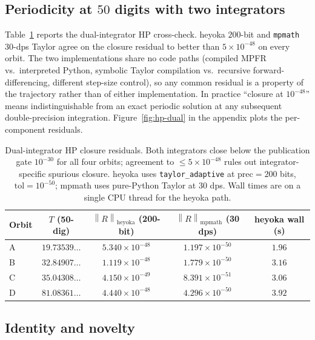 \documentclass[10pt]{article}
\newcommand{\Norm}[1]{\left\lVert#1\right\rVert}
\begin{document}
\subsection{Periodicity at $50$ digits with two integrators}

Table~\ref{tab:hp-dual} reports the dual-integrator HP cross-check.
heyoka $200$-bit and \texttt{mpmath} $30$-dps Taylor agree on the
closure residual to better than $5 \times 10^{-48}$ on every orbit.
The two implementations share no code paths (compiled MPFR vs.\
interpreted Python, symbolic Taylor compilation vs.\ recursive
forward-differencing, different step-size control), so any common
residual is a property of the trajectory rather than of either
implementation. In practice ``closure at $10^{-48}$'' means
indistinguishable from an exact periodic solution at any subsequent
double-precision integration. Figure~\ref{fig:hp-dual} in the
appendix plots the per-component residuals.

\begin{table}[!htb]
\centering
\caption{Dual-integrator HP closure residuals. Both integrators close
below the publication gate $10^{-30}$ for all four orbits; agreement
to $\le\!5\!\times\!10^{-48}$ rules out integrator-specific spurious
closure. heyoka uses \texttt{taylor\_adaptive} at $\mathrm{prec}=200$
bits, $\mathrm{tol} = 10^{-50}$; mpmath uses pure-Python Taylor at
$30$ dps. Wall times are on a single CPU thread for the heyoka path.}
\label{tab:hp-dual}
\footnotesize
\setlength{\tabcolsep}{6pt}
\begin{tabular}{@{}l c c c c@{}}
\toprule
Orbit & $T$ (50-dig) & $\Norm{R}_{\mathrm{heyoka}}$ (200-bit) &
$\Norm{R}_{\mathrm{mpmath}}$ (30 dps) & heyoka wall (s)\\
\midrule
A & $19.73539\ldots$ & $5.340\times 10^{-48}$ & $1.197\times 10^{-50}$ & $1.96$ \\
B & $32.84907\ldots$ & $1.119\times 10^{-48}$ & $1.779\times 10^{-50}$ & $3.16$ \\
C & $35.04308\ldots$ & $4.150\times 10^{-49}$ & $8.391\times 10^{-51}$ & $3.06$ \\
D & $81.08361\ldots$ & $4.440\times 10^{-48}$ & $4.296\times 10^{-50}$ & $3.92$ \\
\bottomrule
\end{tabular}
\end{table}

\subsection{Identity and novelty}
\label{sec:novelty}
\end{document}
